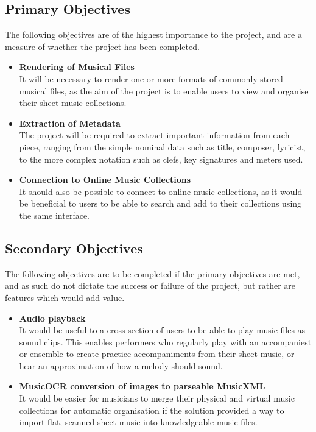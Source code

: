 \subsection{Primary Objectives}
The following objectives are of the highest importance to the project, and are a measure of whether the project has been completed.
\begin{itemize}
    \item \textbf{Rendering of Musical Files}\\
    It will be necessary to render one or more formats of commonly stored musical files, as the aim of the project is to enable users to view and organise their sheet music collections.
    \item \textbf{Extraction of Metadata}\\
    The project will be required to extract important information from each piece, ranging from the simple nominal data such as title, composer, lyricist, to the more complex notation such as clefs, key signatures and meters used. 
    \item \textbf{Connection to Online Music Collections}\\
    It should also be possible to connect to online music collections, as it would be beneficial to users to be able to search and add to their collections using the same interface.

\end{itemize}
\subsection{Secondary Objectives}
The following objectives are to be completed if the primary objectives are met, and as such do not dictate the success or failure of the project, but rather are features which would add value.

\begin{itemize}
    \item \textbf{Audio playback}\\
    It would be useful to a cross section of users to be able to play music files as sound clips. This enables performers who regularly play with an accompaniest or ensemble to create practice accompaniments from their sheet music, or hear an approximation of how a melody should sound.
    \item \textbf{MusicOCR conversion of images to parseable MusicXML}\\
It would be easier for musicians to merge their physical and virtual music collections for automatic organisation if the solution provided a way to import flat, scanned sheet music into knowledgeable music files. 
\end{itemize}
